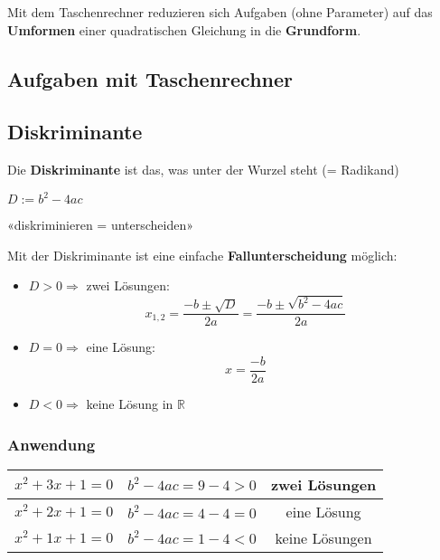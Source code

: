 \begin{rezept}{}{}
Mit dem Taschenrechner reduzieren sich Aufgaben (ohne Parameter) auf
das \textbf{Umformen} einer quadratischen Gleichung in die \textbf{Grundform}.
\end{rezept}
\newpage
\subsection*{Aufgaben mit Taschenrechner}

\newpage


\subsection{Diskriminante}
Die \textbf{Diskriminante} ist das, was unter der Wurzel steht (= Radikand)

$D := b^2 - 4ac$

«diskriminieren = unterscheiden»

Mit der Diskriminante ist eine einfache \textbf{Fallunterscheidung} möglich:
\begin{itemize}
\item $D > 0 \Rightarrow $ zwei Lösungen:
  $$x_{1,2} = \frac{-b \pm \sqrt{D}}{2a} = \frac{-b \pm \sqrt{b^2 -
    4ac}}{2a}$$

\item $D = 0 \Rightarrow $ eine Lösung:
  $$ x = \frac{-b}{2a}$$

\item $D < 0 \Rightarrow $ keine Lösung in $\mathbb{R}$

\end{itemize}

\subsubsection{Anwendung}

\begin{tabular}{c|c|c}
  $x^2 + 3x +1 = 0$ & $b^2-4ac = 9 -4 > 0$ & zwei Lösungen \\
  \hline
  $x^2 + 2x +1 = 0$ & $b^2-4ac = 4 -4 = 0$ & eine Lösung \\
  \hline
  $x^2 + 1x +1 = 0$ & $b^2-4ac = 1 -4 < 0$ & keine Lösungen \\
\end{tabular}




